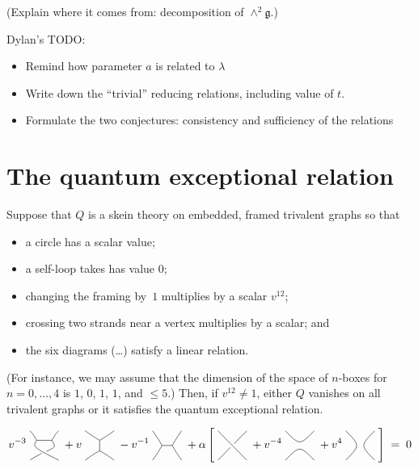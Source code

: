 \documentclass[12pt]{amsart}
\begin{document}
(Explain where it comes from: decomposition of $\wedge^2
\mathfrak{g}$.)

Dylan's TODO:
\begin{itemize}
\item Remind how parameter $a$ is related to $\lambda$
\item Write down the ``trivial'' reducing relations, including value
  of $t$.
\item Formulate the two conjectures: consistency and sufficiency of
  the relations
\end{itemize}

\section{The quantum exceptional relation}
\label{sec:relation}

\begin{theorem}
  Suppose that $Q$ is a skein theory on embedded, framed trivalent graphs so that
  \begin{itemize}
  \item a circle has a scalar value;
  \item a self-loop takes has value $0$;
  \item changing the framing by~$1$ multiplies by a scalar $v^{12}$;
  \item crossing two strands near a vertex multiplies by a scalar; and
  \item the six diagrams (\dots) satisfy a linear relation.
  \end{itemize}
  (For instance, we may assume that the dimension of the space of
  $n$-boxes for $n=0,\dots,4$ is $1$, $0$, $1$, $1$, and $\le 5$.)
  Then, if $v^{12} \ne 1$, either $Q$ vanishes on all trivalent graphs
  or it satisfies the quantum exceptional relation.
\end{theorem}


\[
v^{-3} \;
\drawcrossX
\;+ v \;
\drawI
\; -v^{-1} \;
 \drawH
\;
 + \alpha
\left[\; \braidcross \;
 + v^{-4}\;
\twostrandid
\; + v^{4} \;
 \cupcap \;
 \right] \; = \; 0
\]
\end{document}
